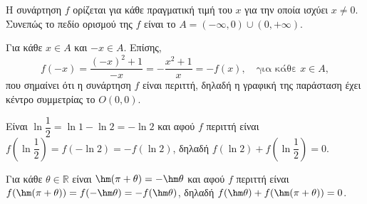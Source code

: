 \begin{alist}
\item Η συνάρτηση $f$ ορίζεται για κάθε πραγματική τιμή του $x$ για την οποία ισχύει $x \ne 0$.
Συνεπώς το πεδίο ορισμού της $f$ είναι το $A = (-\infty, 0) \cup (0, +\infty)$.
\item Για κάθε $x \in A$ και $-x \in A$. Επίσης,
\[f(-x) = \dfrac{(-x)^2 + 1}{-x} = -\dfrac{x^2 + 1}{x} = -f(x), \quad \text{για κάθε } x \in A,\]
που σημαίνει ότι η συνάρτηση $f$ είναι περιττή, δηλαδή η γραφική της παράσταση έχει κέντρο συμμετρίας το $O(0, 0)$.
\item Είναι $\ln\dfrac{1}{2} = \ln 1 - \ln 2 = -\ln 2$ και αφού $f$ περιττή είναι $f\left(\ln\dfrac{1}{2}\right) = f(-\ln 2) = -f(\ln 2)$, δηλαδή $f(\ln 2) + f\left(\ln\dfrac{1}{2}\right) = 0$.
\item Για κάθε $\theta \in \mathbb{R}$ είναι $\hm (\pi + \theta) = -\hm \theta$ και αφού $f$ περιττή είναι $f(\hm (\pi + \theta)) = f(-\hm \theta) = -f(\hm \theta)$, δηλαδή $f(\hm \theta) + f(\hm (\pi + \theta)) = 0$.
\end{alist}

